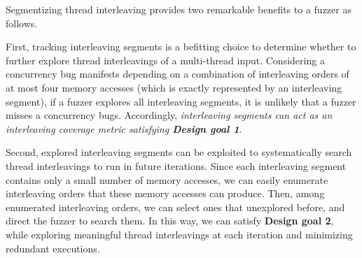 



%
Segmentizing thread interleaving provides two remarkable benefits to a
fuzzer as follows.



First, tracking interleaving segments is a befitting choice to
determine whether to further explore thread interleavings of a
multi-thread input.
%
%
Considering a concurrency bug manifests depending on a combination of
interleaving orders of at most four memory accesses (which is exactly
represented by an interleaving segment), if a fuzzer explores all
interleaving segments, it is unlikely that a fuzzer misses a
concurrency bugs.
%
Accordingly, \textit{interleaving segments can act as an
  interleaving coverage metric satisfying \textbf{Design goal 1}}.






Second, explored interleaving segments can be exploited to
systematically search thread interleavings to run in future
iterations.
%
Since each interleaving segment contains only a small number of memory
accesses, we can easily enumerate interleaving orders that these
memory accesses can produce.
%
Then, among enumerated interleaving orders, we can select ones that
unexplored before, and direct the fuzzer to search them.
%
In this way, we can satisfy \textbf{Design goal 2}, while exploring
meaningful thread interleavings at each iteration and minimizing
redundant executions.


